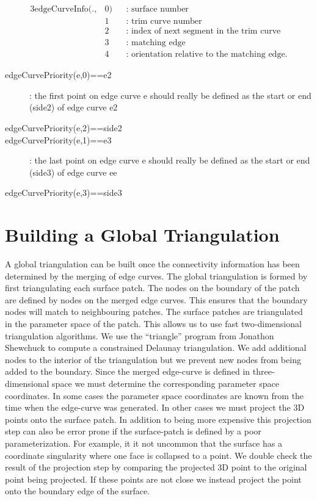\documentclass[11pt]{article}
\begin{document}
\begin{alignat*}{3}
   \text{edgeCurveInfo}(.,&0) &&\mbox{: surface number} \\
                   &1  &&\mbox{: trim curve number} \\
                   &2  &&\mbox{: index of next segment in the trim curve} \\
                   &3  &&\mbox{: matching edge} \\ 
                   &4  &&\mbox{: orientation relative to the matching edge.}
\end{alignat*}


\begin{description}
 \item[edgeCurvePriority(e,0)==e2]  : the first point on edge curve e should really be defined as
                                the start or end (side2) of edge curve e2
 \item[edgeCurvePriority(e,2)==side2]
 \item[edgeCurvePriority(e,1)==e3]   : the last point on edge curve e should really be defined as
                               the start or end (side3) of edge curve ee
 \item[edgeCurvePriority(e,3)==side3]
\end{description}  



\section{Building a Global Triangulation}


A global triangulation can be built once the connectivity information has been determined by
the merging of edge curves. The global triangulation is formed by first triangulating each
surface patch. The nodes on the boundary of the patch are defined by nodes on the merged edge curves. This ensures
that the boundary nodes will match to neighbouring patches. The surface patches are triangulated
in the parameter space of the patch. This allows us to use fast two-dimensional triangulation
algorithms. We use the ``triangle'' program from Jonathon Shewchuck\cite{Shewchuck} to compute a
constrained Delaunay triangulation. We add additional nodes to the interior of the triangulation
but we prevent new nodes from being added to the boundary. Since the merged edge-curve is defined
in three-dimensional space we must determine the corresponding parameter space coordinates. In some cases
the parameter space coordinates are known from the time when the edge-curve was generated. In other
cases we must project the 3D points onto the surface patch. In addition to being more expensive this
projection step can also be error prone if the surface-patch is defined by a poor parameterization.
For example, it it not uncommon that the surface has a coordinate singularity where one face is
collapsed to a point. We double check the result of the projection step by comparing the projected
3D point to the original point being projected. If these points are not close we instead project the
point onto the boundary edge of the surface.
\end{document}
